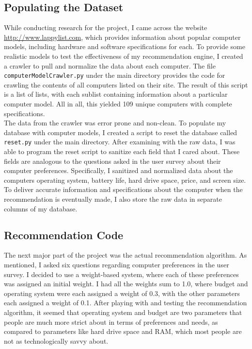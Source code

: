 \documentclass[10pt,letter]{article}
\begin{document}
\subsection{Populating the Dataset}

While conducting research for the project, I came across the website \url{http://www.lappylist.com}, which provides information about popular computer models, including hardware and software specifications for each. To provide some realistic models to test the effectiveness of my recommendation engine, I created a crawler to pull and normalize the data about each computer. The file \texttt{computerModelCrawler.py} under the main directory provides the code for crawling the contents of all computers listed on their site. The result of this script is a list of lists, with each sublist containing information about a particular computer model. All in all, this yielded 109 unique computers with complete specifications.\\

The data from the crawler was error prone and non-clean. To populate my database with computer models, I created a script to reset the database called \texttt{reset.py} under the main directory. After examining with the raw data, I was able to program the reset script to sanitize each field that I cared about. These fields are analogous to the questions asked in the user survey about their computer preferences. Specifically, I sanitized and normalized data about the computers operating system, battery life, hard drive space, price, and screen size. To deliver accurate information and specifications about the computer when the recommendation is eventually made, I also store the raw data in separate columns of my database.

\subsection{Recommendation Code}

The next major part of the project was the actual recommendation algorithm. As mentioned, I asked six questions regarding computer preferences in the user survey. I decided to use a weight-based system, where each of these preferences was assigned an initial weight. I had all the weights sum to 1.0, where budget and operating system were each assigned a weight of 0.3, with the other parameters each assigned a weight of 0.1. After playing with and testing the recommendation algorithm, it seemed that operating system and budget are two parameters that people are much more strict about in terms of preferences and needs, as compared to parameters like hard drive space and RAM, which most people are not as technologically savvy about.\\
\end{document}
